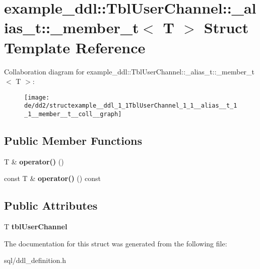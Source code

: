 \hypertarget{structexample__ddl_1_1TblUserChannel_1_1__alias__t_1_1__member__t}{}\section{example\+\_\+ddl\+:\+:Tbl\+User\+Channel\+:\+:\+\_\+alias\+\_\+t\+:\+:\+\_\+member\+\_\+t$<$ T $>$ Struct Template Reference}
\label{structexample__ddl_1_1TblUserChannel_1_1__alias__t_1_1__member__t}


Collaboration diagram for example\+\_\+ddl\+:\+:Tbl\+User\+Channel\+:\+:\+\_\+alias\+\_\+t\+:\+:\+\_\+member\+\_\+t$<$ T $>$\+:
\nopagebreak
\begin{figure}[H]
\begin{center}
\leavevmode
\texttt{[image: de/dd2/structexample\_\_ddl\_1\_1TblUserChannel\_1\_1\_\_alias\_\_t\_1\_1\_\_member\_\_t\_\_coll\_\_graph]}
\end{center}
\end{figure}
\subsection*{Public Member Functions}
\begin{DoxyCompactItemize}
\item 
\hypertarget{structexample__ddl_1_1TblUserChannel_1_1__alias__t_1_1__member__t_ac14100c884080fc8ea1ec456ebdad667}{}T \& {\bfseries operator()} ()\label{structexample__ddl_1_1TblUserChannel_1_1__alias__t_1_1__member__t_ac14100c884080fc8ea1ec456ebdad667}

\item 
\hypertarget{structexample__ddl_1_1TblUserChannel_1_1__alias__t_1_1__member__t_a2820e46289deca52e8b6ef2fec7690cf}{}const T \& {\bfseries operator()} () const \label{structexample__ddl_1_1TblUserChannel_1_1__alias__t_1_1__member__t_a2820e46289deca52e8b6ef2fec7690cf}

\end{DoxyCompactItemize}
\subsection*{Public Attributes}
\begin{DoxyCompactItemize}
\item 
\hypertarget{structexample__ddl_1_1TblUserChannel_1_1__alias__t_1_1__member__t_a0feb54b514c84fa975a66f613ae0c80b}{}T {\bfseries tbl\+User\+Channel}\label{structexample__ddl_1_1TblUserChannel_1_1__alias__t_1_1__member__t_a0feb54b514c84fa975a66f613ae0c80b}

\end{DoxyCompactItemize}


The documentation for this struct was generated from the following file\+:\begin{DoxyCompactItemize}
\item 
sql/ddl\+\_\+definition.\+h\end{DoxyCompactItemize}
